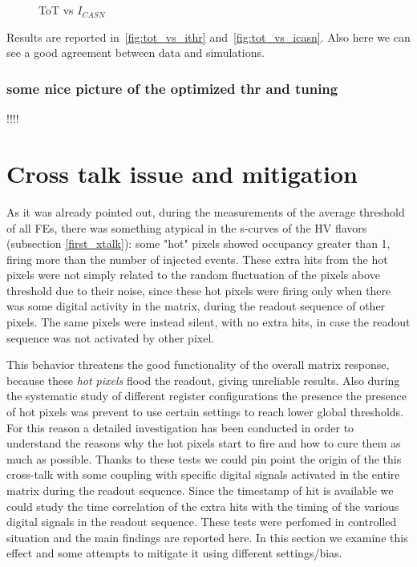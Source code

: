 \begin{figure}[h!]
\centering
{}\\%
{}\\
\caption{ToT vs $I_{CASN}$}
\label{fig:tot_vs_icasn}
\end{figure}

Results are reported in~\autoref{fig:tot_vs_ithr} and~\autoref{fig:tot_vs_icasn}. Also here we can see a good agreement between data and simulations.

\subsubsection{some nice picture of the optimized thr and tuning}

!!!!


\section{Cross talk issue and mitigation} \label{sec:xtalk}

As it was already pointed out, during the measurements of the average threshold of all FEs, there was something atypical in the s-curves of the HV flavors (subsection \vref{first_xtalk}): some "hot" pixels showed occupancy greater than 1, firing more than the number of injected events. These extra hits from the hot pixels were not simply related to the random fluctuation of the pixels above threshold due to their noise, since these hot pixels were firing only when there was some digital activity in the matrix, during the readout sequence of other pixels. The same pixels were instead silent, with no extra hits, in case the readout sequence was not activated by other pixel. 

This behavior threatens the good functionality of the overall matrix response, because these \textit{hot pixels} flood the readout, giving unreliable results.
Also during the systematic study of different register configurations the presence the presence of hot pixels was prevent to use certain settings to reach lower global thresholds. \\

For this reason a detailed investigation has been conducted in order to understand the reasons why the hot pixels start to fire and how to cure them as much as possible. 
Thanks to these tests we could pin point the origin of the this cross-talk with some coupling with specific digital signals activated in the entire matrix during the readout sequence.
Since the timestamp of hit is available we could study the time correlation of the extra hits with the timing of the various digital signals in the readout sequence.  
These tests were perfomed in controlled situation and the main findings are reported here.  In this section we examine this effect and some attempts to mitigate it using different settings/bias.



